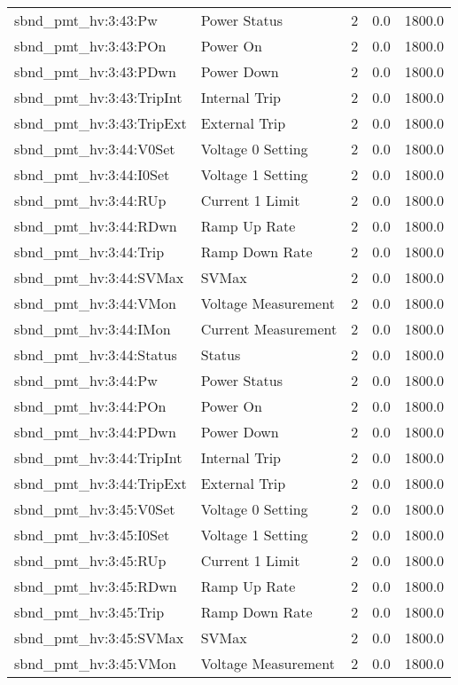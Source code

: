 \begin{center}
\begin{longtable}{l | l l l l }
sbnd\_pmt\_hv:3:43:Pw & Power Status & 2 & 0.0 & 1800.0\\ 
sbnd\_pmt\_hv:3:43:POn & Power On & 2 & 0.0 & 1800.0\\ 
sbnd\_pmt\_hv:3:43:PDwn & Power Down & 2 & 0.0 & 1800.0\\ 
sbnd\_pmt\_hv:3:43:TripInt & Internal Trip & 2 & 0.0 & 1800.0\\ 
sbnd\_pmt\_hv:3:43:TripExt & External Trip & 2 & 0.0 & 1800.0\\ 
sbnd\_pmt\_hv:3:44:V0Set & Voltage 0 Setting & 2 & 0.0 & 1800.0\\ 
sbnd\_pmt\_hv:3:44:I0Set & Voltage 1 Setting & 2 & 0.0 & 1800.0\\ 
sbnd\_pmt\_hv:3:44:RUp & Current 1 Limit & 2 & 0.0 & 1800.0\\ 
sbnd\_pmt\_hv:3:44:RDwn & Ramp Up Rate & 2 & 0.0 & 1800.0\\ 
sbnd\_pmt\_hv:3:44:Trip & Ramp Down Rate & 2 & 0.0 & 1800.0\\ 
sbnd\_pmt\_hv:3:44:SVMax & SVMax & 2 & 0.0 & 1800.0\\ 
sbnd\_pmt\_hv:3:44:VMon & Voltage Measurement & 2 & 0.0 & 1800.0\\ 
sbnd\_pmt\_hv:3:44:IMon & Current Measurement & 2 & 0.0 & 1800.0\\ 
sbnd\_pmt\_hv:3:44:Status & Status & 2 & 0.0 & 1800.0\\ 
sbnd\_pmt\_hv:3:44:Pw & Power Status & 2 & 0.0 & 1800.0\\ 
sbnd\_pmt\_hv:3:44:POn & Power On & 2 & 0.0 & 1800.0\\ 
sbnd\_pmt\_hv:3:44:PDwn & Power Down & 2 & 0.0 & 1800.0\\ 
sbnd\_pmt\_hv:3:44:TripInt & Internal Trip & 2 & 0.0 & 1800.0\\ 
sbnd\_pmt\_hv:3:44:TripExt & External Trip & 2 & 0.0 & 1800.0\\ 
sbnd\_pmt\_hv:3:45:V0Set & Voltage 0 Setting & 2 & 0.0 & 1800.0\\ 
sbnd\_pmt\_hv:3:45:I0Set & Voltage 1 Setting & 2 & 0.0 & 1800.0\\ 
sbnd\_pmt\_hv:3:45:RUp & Current 1 Limit & 2 & 0.0 & 1800.0\\ 
sbnd\_pmt\_hv:3:45:RDwn & Ramp Up Rate & 2 & 0.0 & 1800.0\\ 
sbnd\_pmt\_hv:3:45:Trip & Ramp Down Rate & 2 & 0.0 & 1800.0\\ 
sbnd\_pmt\_hv:3:45:SVMax & SVMax & 2 & 0.0 & 1800.0\\ 
sbnd\_pmt\_hv:3:45:VMon & Voltage Measurement & 2 & 0.0 & 1800.0\\ 

\end{longtable}
\end{center}
